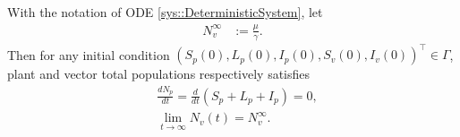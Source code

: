 \begin{theorem}\label{thm::conservationlaw}
	With the notation of ODE \eqref{sys::DeterministicSystem}, let
	\begin{equation*}
		\begin{aligned}
		 	N_v^{\infty} &:= \frac{\mu}{\gamma}.
		 \end{aligned}
	\end{equation*}
	Then for any initial condition 
	$
		(S_p(0), L_p(0), I_p(0), S_v(0), I_v(0) )^\top
	 	\in \Gamma
	$, plant and vector total populations respectively satisfies
	\begin{equation*}
		\begin{aligned}
			& \frac{d N_p}{dt} =
				\frac{d}{dt}(S_p + L_p + I_p) = 0,
			\\
			& \lim_{t\to \infty}
				N_v(t) = N_v^{\infty}.
		\end{aligned}
	\end{equation*}
\end{theorem}
